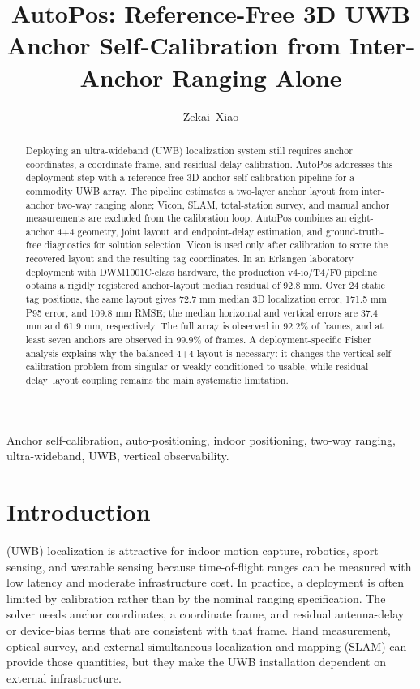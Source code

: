 \documentclass[journal,twoside,web]{ieeecolor}
\begin{document}
\title{AutoPos: Reference-Free 3D UWB Anchor Self-Calibration from Inter-Anchor Ranging Alone}

\author{Zekai~Xiao}

\maketitle

\begin{abstract}
Deploying an ultra-wideband (UWB) localization system still requires anchor coordinates, a coordinate frame, and residual delay calibration. AutoPos addresses this deployment step with a reference-free 3D anchor self-calibration pipeline for a commodity UWB array. The pipeline estimates a two-layer anchor layout from inter-anchor two-way ranging alone; Vicon, SLAM, total-station survey, and manual anchor measurements are excluded from the calibration loop. AutoPos combines an eight-anchor 4+4 geometry, joint layout and endpoint-delay estimation, and ground-truth-free diagnostics for solution selection. Vicon is used only after calibration to score the recovered layout and the resulting tag coordinates. In an Erlangen laboratory deployment with DWM1001C-class hardware, the production v4-io/T4/F0 pipeline obtains a rigidly registered anchor-layout median residual of 92.8 mm. Over 24 static tag positions, the same layout gives 72.7 mm median 3D localization error, 171.5 mm P95 error, and 109.8 mm RMSE; the median horizontal and vertical errors are 37.4 mm and 61.9 mm, respectively. The full array is observed in 92.2\% of frames, and at least seven anchors are observed in 99.9\% of frames. A deployment-specific Fisher analysis explains why the balanced 4+4 layout is necessary: it changes the vertical self-calibration problem from singular or weakly conditioned to usable, while residual delay--layout coupling remains the main systematic limitation.
\end{abstract}

\begin{IEEEkeywords}
Anchor self-calibration, auto-positioning, indoor positioning, two-way ranging, ultra-wideband, UWB, vertical observability.
\end{IEEEkeywords}

\section{Introduction}
\label{sec:introduction}

 (UWB) localization is attractive for indoor motion capture, robotics, sport sensing, and wearable sensing because time-of-flight ranges can be measured with low latency and moderate infrastructure cost. In practice, a deployment is often limited by calibration rather than by the nominal ranging specification. The solver needs anchor coordinates, a coordinate frame, and residual antenna-delay or device-bias terms that are consistent with that frame. Hand measurement, optical survey, and external simultaneous localization and mapping (SLAM) can provide those quantities, but they make the UWB installation dependent on external infrastructure.
\end{document}
